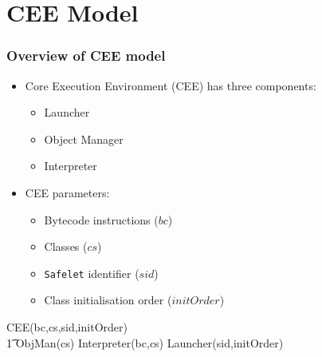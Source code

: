 \documentclass{beamer}
\begin{document}
\section{CEE Model}

\begin{frame}
  \frametitle{Overview of CEE model}
  \begin{itemize}
  \item Core Execution Environment (CEE) has three components:
    \begin{itemize}
    \item Launcher
    \item Object Manager
    \item Interpreter 
    
    \end{itemize}
  \item CEE parameters:
    \begin{itemize}
    \item Bytecode instructions ($bc$)
    \item Classes ($cs$)
    \item \texttt{Safelet} identifier ($sid$)
    \item Class initialisation order ($initOrder$)
    \end{itemize}
  \end{itemize}
  \vspace{-0.8cm}
  {\setlength{\zedindent}{2mm}
    \setlength{\zedleftsep}{2mm}
    \setlength{\zedtab}{0.7em}
    \begin{circus}
      \circprocess CEE(bc,cs,sid,initOrder) \circdef \\
      \t1 ObjMan(cs) \parallel Interpreter(bc,cs)  \parallel Launcher(sid,initOrder)
    \end{circus}}
\end{frame}
\end{document}
